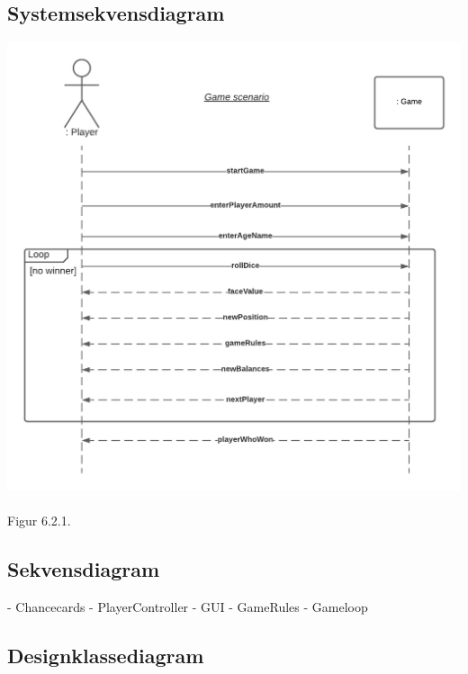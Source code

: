 \begin{flushleft}
\subsection{Systemsekvensdiagram}
\includegraphics[width=1\textwidth]{Report/figures/System sekvensdiagram.png}~\\[1cm]
Figur 6.2.1.
\subsection{Sekvensdiagram}

- Chancecards
- PlayerController
- GUI
- GameRules
- Gameloop

\subsection{Designklassediagram}


\end{flushleft}
